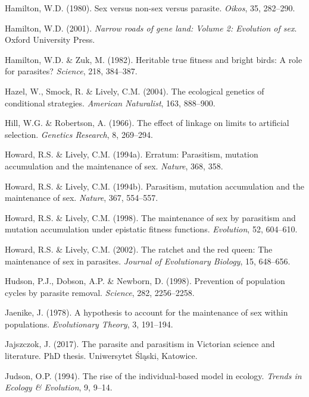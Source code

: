 \documentclass[
  letterpaper,
]{book}
\newlength{\cslhangindent}
\newenvironment{CSLReferences}[2] %
 {\begin{list}{}{%
  \setlength{\itemindent}{0pt}
  \setlength{\leftmargin}{0pt}
  \setlength{\parsep}{0pt}
  \ifodd #1
   \setlength{\leftmargin}{\cslhangindent}
   \setlength{\itemindent}{-1\cslhangindent}
  \fi
  \setlength{\itemsep}{#2\baselineskip}}}
 {\end{list}}
\begin{document}
\begin{CSLReferences}{1}{0}
Hamilton, W.D. (1980). Sex versus non-sex versus parasite. \emph{Oikos},
35, 282--290.

Hamilton, W.D. (2001). \emph{Narrow roads of gene land: Volume 2:
Evolution of sex}. Oxford University Press.

Hamilton, W.D. \& Zuk, M. (1982). Heritable true fitness and bright
birds: A role for parasites? \emph{Science}, 218, 384--387.

Hazel, W., Smock, R. \& Lively, C.M. (2004). The ecological genetics of
conditional strategies. \emph{American Naturalist}, 163, 888--900.

Hill, W.G. \& Robertson, A. (1966). The effect of linkage on limits to
artificial selection. \emph{Genetics Research}, 8, 269--294.

Howard, R.S. \& Lively, C.M. (1994a). Erratum: Parasitism, mutation
accumulation and the maintenance of sex. \emph{Nature}, 368, 358.

Howard, R.S. \& Lively, C.M. (1994b). Parasitism, mutation accumulation
and the maintenance of sex. \emph{Nature}, 367, 554--557.

Howard, R.S. \& Lively, C.M. (1998). The maintenance of sex by
parasitism and mutation accumulation under epistatic fitness functions.
\emph{Evolution}, 52, 604--610.

Howard, R.S. \& Lively, C.M. (2002). The ratchet and the red queen: The
maintenance of sex in parasites. \emph{Journal of Evolutionary Biology},
15, 648--656.

Hudson, P.J., Dobson, A.P. \& Newborn, D. (1998). Prevention of
population cycles by parasite removal. \emph{Science}, 282, 2256--2258.

Jaenike, J. (1978). A hypothesis to account for the maintenance of sex
within populations. \emph{Evolutionary Theory}, 3, 191--194.

Jajszczok, J. (2017). The parasite and parasitism in {Victorian} science
and literature. PhD thesis. Uniwersytet Śląski, Katowice.

Judson, O.P. (1994). The rise of the individual-based model in ecology.
\emph{Trends in Ecology \& Evolution}, 9, 9--14.


\end{CSLReferences}
\end{document}
